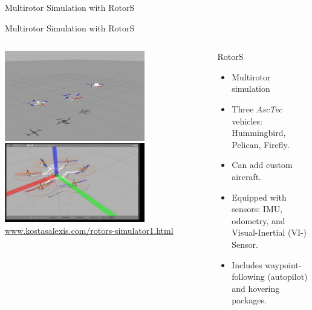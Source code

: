 \documentclass[9pt]{beamer}
\begin{document}
\begin{section}{Multirotor Simulation with RotorS}
    \begin{frame}{Multirotor Simulation with RotorS}
    \begin{columns}
        \begin{column}{0.5\textwidth}
            \centering
            \includegraphics[width=0.7\textwidth,trim={0cm 0cm 0cm 0cm},clip]{rotors.jpg} \\
            \includegraphics[width=0.7\textwidth,trim={0cm 0cm 0cm 0cm},clip]{rotors_zoom.jpg} \\ 
        \url{www.kostasalexis.com/rotors-simulator1.html}
        \end{column}
        \begin{column}{0.5\textwidth}
            \begin{block}{RotorS}
                \begin{itemize}
                    \item Multirotor simulation
                    \item Three \textit{AscTec} vehicles: Hummingbird, Pelican, Firefly.
                    \item Can add custom aircraft. 
                    \item Equipped with sensors: IMU, odometry, and Visual-Inertial (VI-) Sensor.
                    \item Includes waypoint-following (autopilot) and hovering packages. 

\end{itemize}
\end{block}
\end{column}
\end{columns}
\end{frame}
\end{section}
\end{document}
